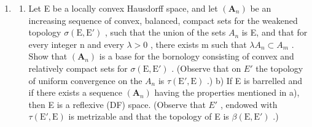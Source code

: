 \begin{enumerate}
\def\labelenumi{\arabic{enumi})}
\setcounter{enumi}{17}
\tightlist
\item
  \begin{enumerate}
  \def\labelenumii{\alph{enumii})}
  \tightlist
  \item
    Let E be a locally convex Hausdorff space, and let \((\mathbf{A}_{n})\) be an increasing sequence of convex, balanced, compact sets for the weakened topology \(\sigma(\mathrm{E}, \mathrm{E}')\) , such that the union of the sets \(A_{n}\) is E, and that for every integer n and every \(\lambda > 0\) , there exists m such that \(\lambda A_{n} \subset A_{m}\) . Show that \((\mathbf{A}_{n})\) is a base for the bornology consisting of convex and relatively compact sets for \(\sigma(\mathrm{E}, \mathrm{E}')\) . (Observe that on \(E'\) the topology of uniform convergence on the \(A_{n}\) is \(\tau(\mathrm{E}', \mathrm{E})\) .) b) If E is barrelled and if there exists a sequence \((\mathbf{A}_{n})\) having the properties mentioned in a), then E is a reflexive (DF) space. (Observe that \(E'\) , endowed with \(\tau(\mathrm{E}', \mathrm{E})\) is metrizable and that the topology of E is \(\beta(\mathrm{E}, \mathrm{E}')\) .)
  \end{enumerate}
\end{enumerate}

